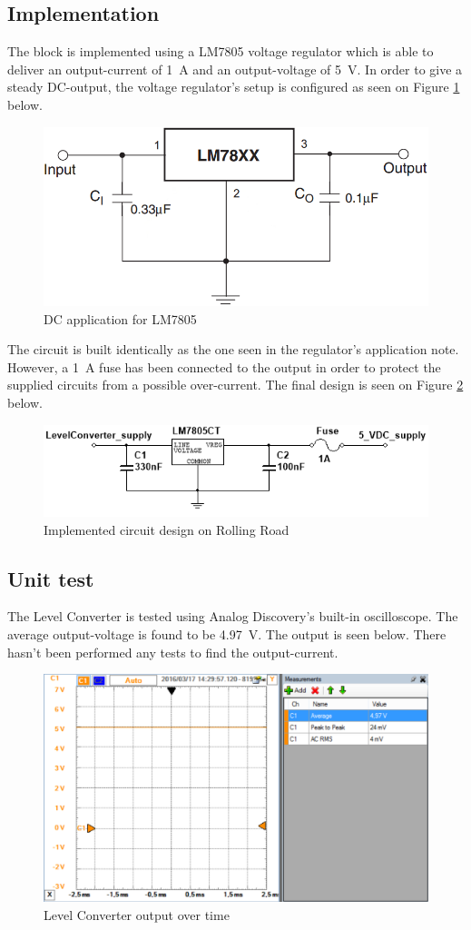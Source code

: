 \subsection{Implementation}
The block is implemented using a LM7805 voltage regulator\cite{LM7805} which is able to deliver an output-current of \SI{1}{\ampere} and an output-voltage of \SI{5}{\volt}. In order to give a steady DC-output, the voltage regulator's setup is configured as seen on Figure \ref{fig:LM7805_app} below.

\begin{figure}[H]
	\centering
	\includegraphics[width=0.4\linewidth]{Hardware/Pictures/LM7805}
	\caption{DC application for LM7805}
	\label{fig:LM7805_app}
\end{figure}

The circuit is built identically as the one seen in the regulator's application note. However, a \SI{1}{\ampere} fuse has been connected to the output in order to protect the supplied circuits from a possible over-current. The final design is seen on Figure \ref{fig:DesignLevelConverter} below.

\begin{figure}[H]
	\centering
	\includegraphics[width=0.7\linewidth]{Hardware/Pictures/DesignLevelConverter}
	\caption{Implemented circuit design on Rolling Road}
	\label{fig:DesignLevelConverter}
\end{figure}

\subsection{Unit test}
The Level Converter is tested using Analog Discovery's built-in oscilloscope. The average output-voltage is found to be \SI{4.97}{\volt}. The output is seen below. There hasn't been performed any tests to find the output-current.

\begin{figure}[H]
	\centering
	\includegraphics[width=0.9\linewidth]{Hardware/Pictures/LevelConverter_test}
	\caption{Level Converter output over time}
	\label{fig:LevelConverter_test}
\end{figure}